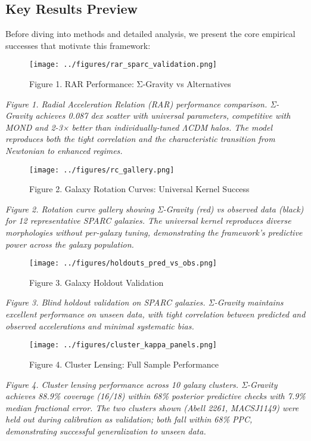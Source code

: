 \documentclass[11pt,a4paper]{article}
\begin{document}
\subsection{Key Results Preview}


Before diving into methods and detailed analysis, we present the core empirical successes that motivate this framework:


\begin{figure}[h]
\centering
\texttt{[image: ../figures/rar\_sparc\_validation.png]}
\caption{Figure 1. RAR Performance: Σ-Gravity vs Alternatives}
\end{figure}


\textit{Figure 1. Radial Acceleration Relation (RAR) performance comparison. Σ-Gravity achieves 0.087 dex scatter with universal parameters, competitive with MOND and 2-3× better than individually-tuned ΛCDM halos. The model reproduces both the tight correlation and the characteristic transition from Newtonian to enhanced regimes.}


\begin{figure}[h]
\centering
\texttt{[image: ../figures/rc\_gallery.png]}
\caption{Figure 2. Galaxy Rotation Curves: Universal Kernel Success}
\end{figure}


\textit{Figure 2. Rotation curve gallery showing Σ-Gravity (red) vs observed data (black) for 12 representative SPARC galaxies. The universal kernel reproduces diverse morphologies without per-galaxy tuning, demonstrating the framework's predictive power across the galaxy population.}


\begin{figure}[h]
\centering
\texttt{[image: ../figures/holdouts\_pred\_vs\_obs.png]}
\caption{Figure 3. Galaxy Holdout Validation}
\end{figure}


\textit{Figure 3. Blind holdout validation on SPARC galaxies. Σ-Gravity maintains excellent performance on unseen data, with tight correlation between predicted and observed accelerations and minimal systematic bias.}


\begin{figure}[h]
\centering
\texttt{[image: ../figures/cluster\_kappa\_panels.png]}
\caption{Figure 4. Cluster Lensing: Full Sample Performance}
\end{figure}


\textit{Figure 4. Cluster lensing performance across 10 galaxy clusters. Σ-Gravity achieves 88.9\% coverage (16/18) within 68\% posterior predictive checks with 7.9\% median fractional error. The two clusters shown (Abell 2261, MACSJ1149) were held out during calibration as validation; both fall within 68\% PPC, demonstrating successful generalization to unseen data.}
\end{document}
